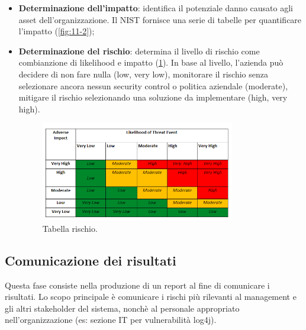 \begin{itemize}
    \item \textbf{Determinazione dell'impatto}: identifica il potenziale danno causato agli asset dell'organizzazione.  Il NIST fornisce una serie di tabelle per quantificare l'impatto (\ref{fig:11-2});

    \item \textbf{Determinazione del rischio}: determina il livello di rischio come combianzione di likelihood e impatto (\ref{fig:11-3}). In base al livello, l'azienda può decidere di non fare nulla (low, very low), monitorare il rischio senza selezionare ancora nessun security control o politica aziendale (moderate), mitigare il rischio selezionando una soluzione da implementare (high, very high).

    \begin{figure}
        \centering
        \includegraphics[width=0.8\textwidth]{images/11-7.png}
        \caption{Tabella rischio.}
        \label{fig:11-3}
    \end{figure}
\end{itemize}

\subsection{Comunicazione dei risultati}
Questa fase consiste nella produzione di un report al fine di comunicare i risultati. Lo scopo principale è comunicare i rischi più rilevanti al management e gli altri stakeholder del sistema, nonchè al personale appropriato nell'organizzazione (es: sezione IT per vulnerabilità log4j).

